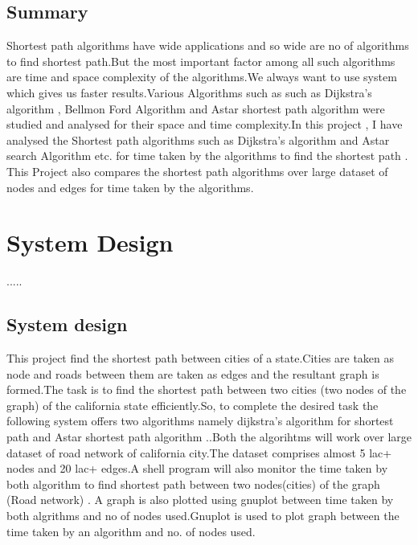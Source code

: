 \documentclass[14pt,a4]{extreport}
\begin{document}
\section{Summary}
Shortest path algorithms have wide applications and so wide are no of algorithms to find shortest path.But the most important factor among all such algorithms are time and space complexity of the algorithms.We always want to use system which gives us faster results.Various Algorithms such as such as Dijkstra's algorithm , Bellmon Ford Algorithm and Astar shortest path algorithm were studied and analysed for their space and time complexity.In this project , I have analysed the Shortest path algorithms such as Dijkstra's algorithm and Astar search Algorithm etc. for time taken by the algorithms to find the shortest path . This Project also compares the shortest path algorithms over large dataset of nodes and edges for time taken by the algorithms. 






\chapter{System Design}

.....

\section{System design}
This project find the shortest path between cities of a state.Cities are taken as node and roads between them are taken as edges and the resultant graph is formed.The task is to find the shortest path between two cities (two nodes of the graph) of the california state efficiently.So, to complete the desired task the following system offers two algorithms namely dijkstra's algorithm for shortest path and Astar shortest path algorithm ..Both the algorihtms will work over large dataset of road network of california city.The dataset comprises 
almost 5 lac+ nodes and 20 lac+ edges.A shell program will also monitor the time taken by both algorithm to find shortest path between two nodes(cities) of the graph (Road network) . A graph is also plotted using gnuplot between time taken by both algrithms and no of nodes used.Gnuplot is used to plot graph between the time taken by an algorithm and no. of nodes used.
\end{document}
